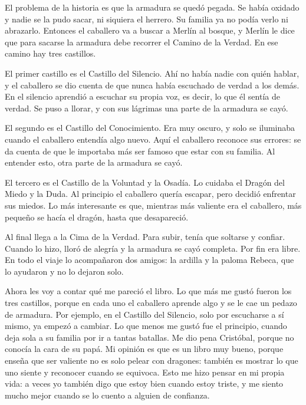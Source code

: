 \documentclass[12pt,a4paper]{article}
\begin{document}
\begin{tcolorbox}[enhanced, breakable, colback=verde!6, colframe=verde, boxrule=1.2pt,
  arc=3mm, left=10pt, right=10pt, top=8pt, bottom=8pt, coltext=verde!70!black]
El problema de la historia es que la armadura se quedó pegada. Se había oxidado y nadie se la pudo
sacar, ni siquiera el herrero. Su familia ya no podía verlo ni abrazarlo. Entonces el caballero va a buscar a Merlín al
bosque, y Merlín le dice que para sacarse la armadura debe recorrer el Camino de la Verdad. En ese camino hay tres castillos.

El primer castillo es el Castillo del Silencio. Ahí no había nadie con quién hablar, y el caballero
se dio cuenta de que nunca había escuchado de verdad a los demás. En el silencio aprendió a escuchar su propia voz, es decir,
lo que él sentía de verdad. Se puso a llorar, y con sus lágrimas una parte de la armadura se cayó.

El segundo es el Castillo del Conocimiento. Era muy oscuro, y solo se iluminaba cuando el caballero
entendía algo nuevo. Aquí el caballero reconoce sus errores: se da cuenta de que le importaba más ser famoso que estar con
su familia. Al entender esto, otra parte de la armadura se cayó.

El tercero es el Castillo de la Voluntad y la Osadía. Lo cuidaba el Dragón del Miedo y la Duda. Al
principio el caballero quería escapar, pero decidió enfrentar sus miedos. Lo más interesante es que, mientras más valiente
era el caballero, más pequeño se hacía el dragón, hasta que desapareció.

Al final llega a la Cima de la Verdad. Para subir, tenía que soltarse y confiar. Cuando lo hizo,
lloró de alegría y la armadura se cayó completa. Por fin era libre. En todo el viaje lo acompañaron dos amigos: la ardilla
y la paloma Rebeca, que lo ayudaron y no lo dejaron solo.

Ahora les voy a contar qué me pareció el libro. Lo que más me gustó fueron los tres castillos,
porque en cada uno el caballero aprende algo y se le cae un pedazo de armadura. Por ejemplo, en el Castillo del Silencio,
solo por escucharse a sí mismo, ya empezó a cambiar. Lo que menos me gustó fue el principio, cuando deja sola a su familia
por ir a tantas batallas. Me dio pena Cristóbal, porque no conocía la cara de su papá. Mi opinión es que es un libro muy
bueno, porque enseña que ser valiente no es solo pelear con dragones: también es mostrar lo que uno siente y reconocer
cuando se equivoca. Esto me hizo pensar en mi propia vida: a veces yo también digo que estoy bien cuando estoy triste, y me siento mucho mejor cuando se lo cuento a alguien de confianza.


\end{tcolorbox}
\end{document}
